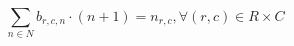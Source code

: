 \documentclass[10pt]{article}
\begin{document}
\[\sum_{n \in N} b_{r,c,n} \cdot (n+1) = n_{r,c}, \forall (r,c) \in R \times C\]
\end{document}
